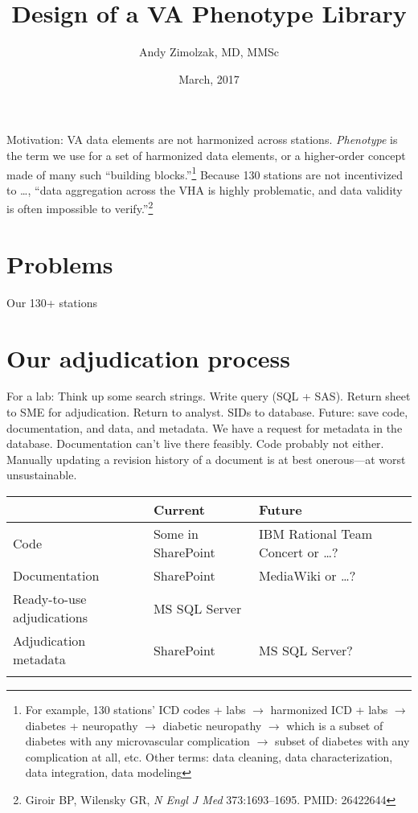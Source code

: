 \documentclass{tufte-handout}
\title{Design of a VA Phenotype Library}
\author{Andy Zimolzak, MD, MMSc}
\date{March, 2017}
\begin{document}
\maketitle

Motivation: VA data elements are not harmonized across stations.
\emph{Phenotype} is the term we use for a set of harmonized data
elements, or a higher-order concept made of many such ``building
blocks.''\footnote{For example, 130 stations' ICD codes + labs $\to$
  harmonized ICD + labs $\to$ diabetes + neuropathy $\to$ diabetic
  neuropathy $\to$ which is a subset of diabetes with any
  microvascular complication $\to$ subset of diabetes with any
  complication at all, etc. Other terms: data cleaning, data
  characterization, data integration, data modeling} Because 130
stations are not incentivized to \ldots{}, %
``data aggregation across the
VHA is highly problematic, and data validity is often impossible to
verify.''\footnote{Giroir BP, Wilensky GR, \emph{N Engl J Med}
  373:1693--1695. PMID: 26422644}

\section{Problems}

Our 130+ stations %

\section{Our adjudication process}

For a lab: Think up some search strings. Write query (SQL + SAS). Return
sheet to SME for adjudication. Return to analyst. SIDs to database.
Future: save code, documentation, and data, and metadata. We have a
request for metadata in the database. Documentation can't live there
feasibly. Code probably not either. Manually updating a revision
history of a document is at best onerous---at worst unsustainable.

\noindent \begin{tabular}{lll}
\\
\hline
 & Current & Future\\
\hline
Code & Some in SharePoint & IBM Rational Team Concert or \ldots{}?\\
Documentation & SharePoint & MediaWiki or \ldots{}?\\
Ready-to-use adjudications & MS SQL Server\\
Adjudication metadata & SharePoint & MS SQL Server?\\
\hline
\\
\end{tabular}
\end{document}
